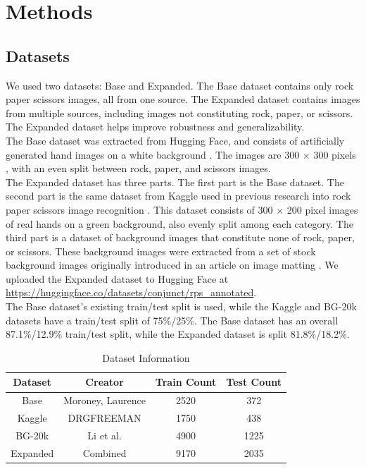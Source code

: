 \documentclass{article}
\begin{document}
\section{Methods} 

\subsection{Datasets}
We used two datasets: Base and Expanded. The Base dataset contains only rock paper scissors images, all from one source. The Expanded dataset contains images from multiple sources, including images not constituting rock, paper, or scissors. The Expanded dataset helps improve robustness and generalizability. \\
The Base dataset was extracted from Hugging Face, and consists of artificially generated hand images on a white background \cite{Moroney}. The images are 300 $\times$ 300 pixels \cite{huggingface}, with an even split between rock, paper, and scissors images. \\
The Expanded dataset has three parts. The first part is the Base dataset. The second part is the same dataset from Kaggle used in previous research into rock paper scissors image recognition \cite{kaggle}. This dataset consists of 300 $\times$ 200 pixel images of real hands on a green background, also evenly split among each category. The third part is a dataset of background images that constitute none of rock, paper, or scissors. These background images were extracted from a set of stock background images originally introduced in an article on image matting \cite{stock} \cite{stockarticle}. We uploaded the Expanded dataset to Hugging Face at 
\url{https://huggingface.co/datasets/conjunct/rps_annotated}. \\
The Base dataset's existing train/test split is used, while the Kaggle and BG-20k datasets have a train/test split of 75\%/25\%. The Base dataset has an overall 87.1\%/12.9\% train/test split, while the Expanded dataset is split 81.8\%/18.2\%.

\begin{table}[h]
\vskip -0.15in
\caption{Dataset Information}
\label{tab:data_sets}
\centering
\small
\begin{tabular}{c | c | c | c}
\toprule
Dataset & Creator & Train Count & Test Count \\
\midrule
Base & Moroney, Laurence & 2520 & 372 \\
\midrule
Kaggle & DRGFREEMAN & 1750 & 438 \\
\midrule
BG-20k & Li et al. & 4900 & 1225 \\
\midrule
Expanded & Combined & 9170 & 2035 \\
\bottomrule
\end{tabular}
\vskip -0.1in
\end{table}
\end{document}
